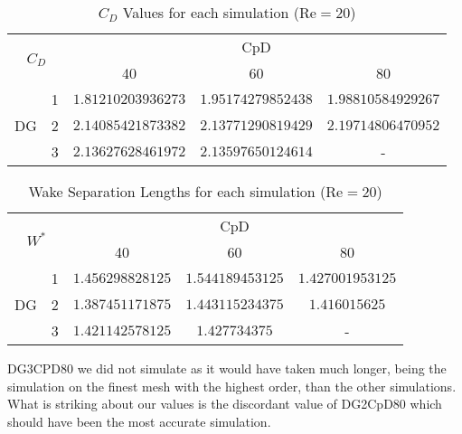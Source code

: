 \begin{table}[htp]
	\centering
	\def\arraystretch{1.5}
			\begin{tabular}{|c|c|c|c|c|}
				\hline
				\multicolumn{2}{|c|}{\multirow{2}{*}{$C_D$}} & \multicolumn{3}{c|}{CpD} \\ \cline{3-5} 
				\multicolumn{2}{|c|}{}                       & 40     & 60    & 80    \\ \hline
				\multirow{3}{*}{DG}            & 1           &    $1.81210203936273$    &  $1.95174279852438$     &    $1.98810584929267$    \\ \cline{2-5} 
				& 2           &    $2.14085421873382$    &    $2.13771290819429$   &   $2.19714806470952$     \\ \cline{2-5} 
				& 3           &    $2.13627628461972$    &     $2.13597650124614$  &   -     \\ \hline
			\end{tabular}
			\caption[$C_D$ Values for each simulation]{$C_D$ Values for each simulation ($\text{Re} = 20$)}	
			\label{C_D20}
		\end{table}
			\begin{table}[htp]
		\centering
		\def\arraystretch{1.5}
		\begin{tabular}{|c|c|c|c|c|}
			\hline
			\multicolumn{2}{|c|}{\multirow{2}{*}{$W^*$}} & \multicolumn{3}{c|}{CpD} \\ \cline{3-5} 
			\multicolumn{2}{|c|}{}                       & 40     & 60    & 80    \\ \hline
			\multirow{3}{*}{DG}            & 1           &    $1.456298828125$    &     $1.544189453125$  &    $1.427001953125$    \\ \cline{2-5} 
			& 2           &    $1.387451171875$    &     $1.443115234375$  &    $1.416015625$    \\ \cline{2-5} 
			& 3           &     $1.421142578125$   &     $1.427734375$  &    -    \\ \hline
		\end{tabular}
		\caption{Wake Separation Lengths for each simulation ($\text{Re} = 20$)}	
		\label{W20}
\end{table}
DG3CPD80 we did not simulate as it would have taken much longer, being the simulation on the finest mesh with the highest order, than the other simulations. What is striking about our values is the discordant value of DG2CpD80 which should have been the most accurate simulation. 
